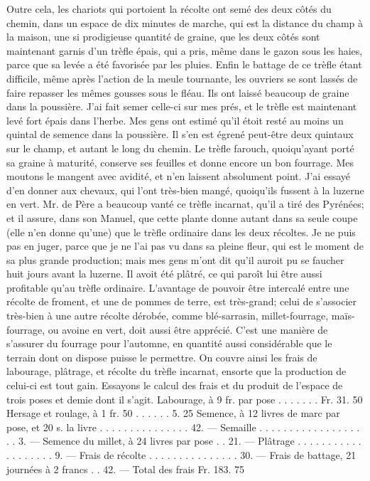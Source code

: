 Outre cela, les chariots qui portoient la récolte ont semé des deux côtés du chemin, dans un espace de dix minutes de marche, qui est la distance du champ à la maison,\setcounter{page}{263} une si prodigieuse quantité de graine, que les deux côtés sont maintenant garnis d'un trèfle épais, qui a pris, même dans le gazon sous les haies, parce que sa levée a été favorisée par les pluies.
Enfin le battage de ce trèfle étant difficile, même après l'action de la meule tournante, les ouvriers se sont lassés de faire repasser les mêmes gousses sous le fléau. Ils ont laissé beaucoup de graine dans la poussière. J'ai fait semer celle-ci sur mes prés, et le trèfle est maintenant levé fort épais dans l'herbe. Mes gens ont estimé qu'il étoit resté au moins un quintal de semence dans la poussière. Il s'en est égrené peut-être deux quintaux sur le champ, et autant le long du chemin.
Le trèfle farouch, quoiqu'ayant porté sa graine à maturité, conserve ses feuilles et donne encore un bon fourrage. Mes moutons le mangent avec avidité, et n'en laissent absolument point. J'ai essayé d'en donner aux chevaux, qui l'ont très-bien mangé, quoiqu'ils fussent à la luzerne en vert.
Mr. de Père a beaucoup vanté ce trèfle incarnat, qu'il a tiré des Pyrénées; et il assure, dans son Manuel, que cette plante donne autant dans sa seule coupe (elle n'en donne qu'une) que le trèfle ordinaire dans les deux récoltes. Je ne puis pas en juger,\setcounter{page}{264} parce que je ne l'ai pas vu dans sa pleine fleur, qui est le moment de sa plus grande production; mais mes gens m'ont dit qu'il auroit pu se faucher huit jours avant la luzerne. Il avoit été plâtré, ce qui paroît lui être aussi profitable qu'au trèfle ordinaire.
L'avantage de pouvoir être intercalé entre une récolte de froment, et une de pommes de terre, est très-grand; celui de s'associer très-bien à une autre récolte dérobée, comme blé-sarrasin, millet-fourrage, maïs-fourrage, ou avoine en vert, doit aussi être apprécié. C'est une manière de s'assurer du fourrage pour l'automne, en quantité aussi considérable que le terrain dont on dispose puisse le permettre. On couvre ainsi les frais de labourage, plâtrage, et récolte du trèfle incarnat, ensorte que la production de celui-ci est tout gain. Essayons le calcul des frais et du produit de l'espace de trois poses et demie dont il s'agit.
Labourage, à 9 fr. par pose . . . . . . . Fr. 31. 50
Hersage et roulage, à 1 fr. 50 . . . . . . 5. 25
Semence, à 12 livres de marc par pose, et
20 s. la livre . . . . . . . . . . . . . . . 42. —
Semaille . . . . . . . . . . . . . . . . . . . 3. —
Semence du millet, à 24 livres par pose . . 21. —
Plâtrage . . . . . . . . . . . . . . . . . . . 9. —
Frais de récolte . . . . . . . . . . . . . . . 30. —
Frais de battage, 21 journées à 2 francs . . 42. —
Total des frais Fr. 183. 75
\setcounter{page}{265}
